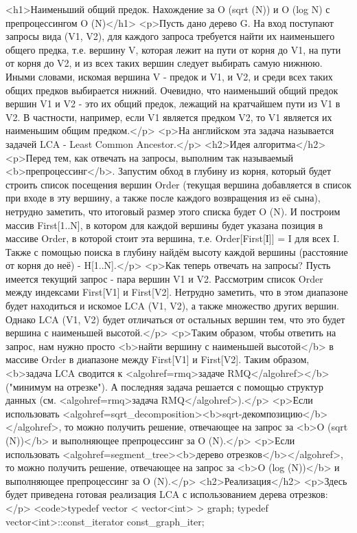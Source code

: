 <h1>Наименьший общий предок. Нахождение за O (sqrt (N)) и O (log N) с препроцессингом O (N)</h1>
<p>Пусть дано дерево G. На вход поступают запросы вида (V1, V2), для каждого запроса требуется найти их наименьшего общего предка, т.е. вершину V, которая лежит на пути от корня до V1, на пути от корня до V2, и из всех таких вершин следует выбирать самую нижнюю. Иными словами, искомая вершина V - предок и V1, и V2, и среди всех таких общих предков выбирается нижний. Очевидно, что наименьший общий предок вершин V1 и V2 - это их общий предок, лежащий на кратчайшем пути из V1 в V2. В частности, например, если V1 является предком V2, то V1 является их наименьшим общим предком.</p>
<p>На английском эта задача называется задачей LCA - Least Common Ancestor.</p>
<h2>Идея алгоритма</h2>
<p>Перед тем, как отвечать на запросы, выполним так называемый <b>препроцессинг</b>. Запустим обход в глубину из корня, который будет строить список посещения вершин Order (текущая вершина добавляется в список при входе в эту вершину, а также после каждого возвращения из её сына), нетрудно заметить, что итоговый размер этого списка будет O (N). И построим массив First[1..N], в котором для каждой вершины будет указана позиция в массиве Order, в которой стоит эта вершина, т.е. Order[First[I]] = I для всех I. Также с помощью поиска в глубину найдём высоту каждой вершины (расстояние от корня до неё) - H[1..N].</p>
<p>Как теперь отвечать на запросы? Пусть имеется текущий запрос - пара вершин V1 и V2. Рассмотрим список Order между индексами First[V1] и First[V2]. Нетрудно заметить, что в этом диапазоне будет находиться и искомое LCA (V1, V2), а также множество других вершин. Однако LCA (V1, V2) будет отличаться от остальных вершин тем, что это будет вершина с наименьшей высотой.</p>
<p>Таким образом, чтобы ответить на запрос, нам нужно просто <b>найти вершину с наименьшей высотой</b> в массиве Order в диапазоне между First[V1] и First[V2]. Таким образом, <b>задача LCA сводится к <algohref=rmq>задаче RMQ</algohref></b> ("минимум на отрезке"). А последняя задача решается с помощью структур данных (см. <algohref=rmq>задача RMQ</algohref>).</p>
<p>Если использовать <algohref=sqrt_decomposition><b>sqrt-декомпозицию</b></algohref>, то можно получить решение, отвечающее на запрос за <b>O (sqrt (N))</b> и выполняющее препроцессинг за O (N).</p>
<p>Если использовать <algohref=segment_tree><b>дерево отрезков</b></algohref>, то можно получить решение, отвечающее на запрос за <b>O (log (N))</b> и выполняющее препроцессинг за O (N).</p>
<h2>Реализация</h2>
<p>Здесь будет приведена готовая реализация LCA с использованием дерева отрезков:</p>
<code>typedef vector < vector<int> > graph;
typedef vector<int>::const_iterator const_graph_iter;


